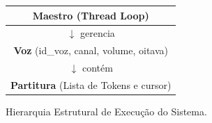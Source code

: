 \documentclass[12pt, a4paper]{article}
\begin{document}
\begin{figure}[h]
  \centering
  \small
  \begin{tabular}{|c|}
    \hline
    \textbf{Maestro} (Thread Loop) \\
    \hline
    $\downarrow$ gerencia \\
    \hline
    \textbf{Voz} (id\_voz, canal, volume, oitava) \\
    \hline
    $\downarrow$ contém \\
    \hline
    \textbf{Partitura} (Lista de Tokens e cursor) \\
    \hline
  \end{tabular}
  \caption{Hierarquia Estrutural de Execução do Sistema.}
\end{figure}
\end{document}
